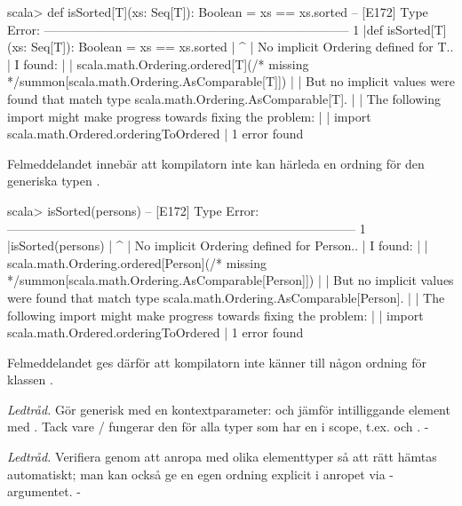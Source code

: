 \SubtaskSolved 
\begin{REPLnonum}
scala> def isSorted[T](xs: Seq[T]): Boolean = xs == xs.sorted
-- [E172] Type Error: --------------------------------------------------------------------------
1 |def isSorted[T](xs: Seq[T]): Boolean = xs == xs.sorted
  |                                                      ^
  | No implicit Ordering defined for T..
  | I found:
  |
  |     scala.math.Ordering.ordered[T](/* missing */summon[scala.math.Ordering.AsComparable[T]])
  |
  | But no implicit values were found that match type scala.math.Ordering.AsComparable[T].
  |
  | The following import might make progress towards fixing the problem:
  |
  |     import scala.math.Ordered.orderingToOrdered
  |
1 error found
\end{REPLnonum}
Felmeddelandet innebär att kompilatorn inte kan härleda en ordning för den generiska typen .

\SubtaskSolved 
\begin{REPLnonum}
scala> isSorted(persons)
-- [E172] Type Error: ------------------------------------------------------------------------------------
1 |isSorted(persons)
  |                 ^
  | No implicit Ordering defined for Person..
  | I found:
  |
  |     scala.math.Ordering.ordered[Person](/* missing */summon[scala.math.Ordering.AsComparable[Person]])
  |
  | But no implicit values were found that match type scala.math.Ordering.AsComparable[Person].
  |
  | The following import might make progress towards fixing the problem:
  |
  |     import scala.math.Ordered.orderingToOrdered
  |
1 error found
\end{REPLnonum}
Felmeddelandet ges därför att kompilatorn inte känner till någon ordning för klassen . 

\SubtaskSolved
\emph{Ledtråd.} Gör  generisk med en kontextparameter:  och jämför intilliggande element med . Tack vare / fungerar den för alla typer som har en  i scope, t.ex.  och .
-

\SubtaskSolved
\emph{Ledtråd.} Verifiera genom att anropa  med olika elementtyper så att rätt  hämtas automatiskt; man kan också ge en egen ordning explicit i anropet via -argumentet.
-

\QUESTEND






